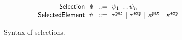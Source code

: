 \begin{figure}
  \vspace{-3px}
  \[
  \arraycolsep=3pt\begin{array}{rlrl}
      \mathsf{Selection} & \selection & ::= &
        \selem_1\dots\selem_n \\
      \mathsf{SelectedElement} & \selem & ::= &
        \tile^{\pat} ~\vert~
        \tile^{\expr} ~\vert~
        \token^{\pat} ~\vert~
        \token^{\expr}
  \end{array}\]
  \caption{
    Syntax of selections.
  }
  \label{fig:selection-syntax}
\end{figure}